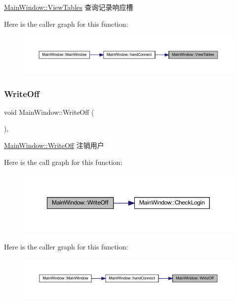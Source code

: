 \mbox{\hyperlink{class_main_window_a9a567ed8fe2074af6b1b276972dddfbd}{Main\+Window\+::\+View\+Tables}} 查询记录响应槽 

Here is the caller graph for this function\+:
\nopagebreak
\begin{figure}[H]
\begin{center}
\leavevmode
\includegraphics[width=350pt]{class_main_window_a9a567ed8fe2074af6b1b276972dddfbd_icgraph}
\end{center}
\end{figure}
\mbox{\label{class_main_window_aae6b6877a9efd611b15d4e7601c3b45a}} 
\subsubsection{\texorpdfstring{WriteOff}{WriteOff}}
{\footnotesize\ttfamily void Main\+Window\+::\+Write\+Off (\begin{DoxyParamCaption}{ }\end{DoxyParamCaption})\hspace{0.3cm}{\ttfamily [private]}, {\ttfamily [slot]}}



\mbox{\hyperlink{class_main_window_aae6b6877a9efd611b15d4e7601c3b45a}{Main\+Window\+::\+Write\+Off}} 注销用户 

Here is the call graph for this function\+:
\nopagebreak
\begin{figure}[H]
\begin{center}
\leavevmode
\includegraphics[width=350pt]{class_main_window_aae6b6877a9efd611b15d4e7601c3b45a_cgraph}
\end{center}
\end{figure}
Here is the caller graph for this function\+:
\nopagebreak
\begin{figure}[H]
\begin{center}
\leavevmode
\includegraphics[width=350pt]{class_main_window_aae6b6877a9efd611b15d4e7601c3b45a_icgraph}
\end{center}
\end{figure}


